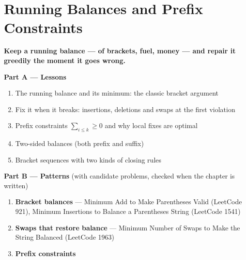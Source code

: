 \chapter{Running Balances and Prefix Constraints}
\label{ch:balances}

\begin{tcolorbox}[enhanced, colback=white, colframe=secondaryblue, boxrule=1pt, arc=2mm]
\textbf{\large\textcolor{primaryblue}{Keep a running balance --- of brackets, fuel, money --- and repair it greedily the moment it goes wrong.}}
\end{tcolorbox}


\begin{plannedbox}
\textbf{Part A --- Lessons}
\begin{enumerate}[leftmargin=*, label=\textbf{A\arabic*.}, itemsep=1pt]
    \item The running balance and its minimum: the classic bracket argument
    \item Fix it when it breaks: insertions, deletions and swaps at the first violation
    \item Prefix constraints $\sum_{i \le k} \ge 0$ and why local fixes are optimal
    \item Two-sided balances (both prefix and suffix)
    \item Bracket sequences with two kinds of closing rules
\end{enumerate}
\textbf{Part B --- Patterns} (with candidate problems, checked when the chapter is written)
\begin{enumerate}[leftmargin=*, label=\textbf{P\arabic*.}, itemsep=1pt]
    \item \textbf{Bracket balances} --- Minimum Add to Make Parentheses Valid {\small\color{darkgray}(LeetCode 921)}, Minimum Insertions to Balance a Parentheses String {\small\color{darkgray}(LeetCode 1541)}
    \item \textbf{Swaps that restore balance} --- Minimum Number of Swaps to Make the String Balanced {\small\color{darkgray}(LeetCode 1963)}
    \item \textbf{Prefix constraints}
\end{enumerate}
\end{plannedbox}

